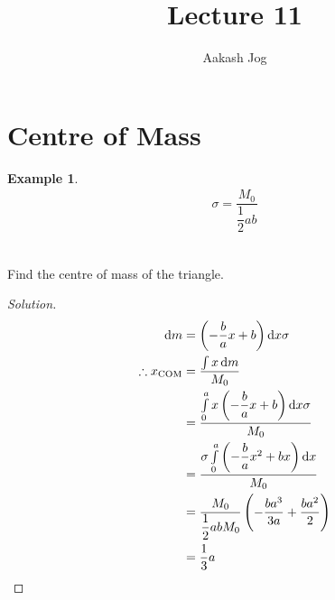 \documentclass[fleqn, a4paper, 12pt]{article}
\title{Lecture 11}
\author{Aakash Jog}
\date{\formatdate{2}{12}{2014}}
\theoremstyle{definition}
\newtheorem{example}{Example}
\theoremstyle{theorem}
\newenvironment{solution}
{\begin{proof}[Solution]\let\qed\relax}
	{\end{proof}}
\begin{document}
\maketitle

\tableofcontents

\newpage
\section{Centre of Mass}

\begin{example}
	\begin{align*}
		\sigma = \dfrac{M_0}{\dfrac{1}{2} a b}
	\end{align*}
	\\
	Find the centre of mass of the triangle.
\end{example}

\begin{solution}
	\begin{align*}
		\dif m &= \left( -\dfrac{b}{a} x + b \right) \dif x \sigma\\
		\therefore x_{\text{COM}} &= \dfrac{\int x \dif m}{M_0}\\
		&= \dfrac{\int\limits_{0}^{a} x \left( -\dfrac{b}{a} x + b\right) \dif x \sigma}{M_0}\\
		&= \dfrac{\sigma \int\limits_{0}^{a} \left( -\dfrac{b}{a} x^2 + b x \right) \dif x }{M_0}\\
		&= \dfrac{M_0}{\dfrac{1}{2} a b M_0} \left( -\dfrac{b a^3}{3a} + \dfrac{b a^2}{2} \right)\\
		&= \dfrac{1}{3} a
	\end{align*}
\end{solution}
\end{document}
